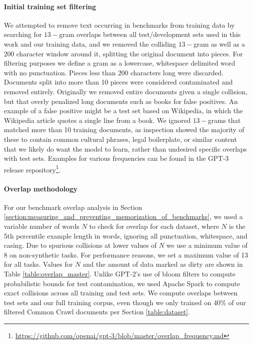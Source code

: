 \documentclass{article}
\begin{document}
\paragraph{Initial training set filtering} We attempted to remove text occurring in benchmarks from training data by searching for $13-$gram overlaps between all test/development sets used in this work and our training data, and we removed the colliding $13-$gram as well as a 200 character window around it, splitting the original document into pieces. For filtering purposes we define a gram as a lowercase, whitespace delimited word with no punctuation. Pieces less than $200$ characters long were discarded. Documents split into more than 10 pieces were considered contaminated and removed entirely. Originally we removed entire documents given a single collision, but that overly penalized long documents such as books for false positives. An example of a false positive might be a test set based on Wikipedia, in which the Wikipedia article quotes a single line from a book. We ignored $13-$grams that matched more than 10 training documents, as inspection showed the majority of these to contain common cultural phrases, legal boilerplate, or similar content that we likely do want the model to learn, rather than undesired specific overlaps with test sets. Examples for various frequencies can be found in the GPT-3 release repository\footnote{\url{https://github.com/openai/gpt-3/blob/master/overlap_frequency.md}}.

\paragraph{Overlap methodology} For our benchmark overlap analysis in Section \ref{section:measuring_and_preventing_memorization_of_benchmarks}, we used a variable number of words $N$ to check for overlap for each dataset, where $N$ is the 5th percentile example length in words, ignoring all punctuation, whitespace, and casing. Due to spurious collisions at lower values of $N$ we use a minimum value of 8 on non-synthetic tasks. For performance reasons, we set a maximum value of 13 for all tasks. Values for $N$ and the amount of data marked as dirty are shown in Table \ref{table:overlap_master}. Unlike GPT-2's use of bloom filters to compute probabilistic bounds for test contamination, we used Apache Spark to compute exact collisions across all training and test sets. We compute overlaps between test sets and our full training corpus, even though we only trained on 40\% of our filtered Common Crawl documents per Section \ref{table:dataset}.
\end{document}
